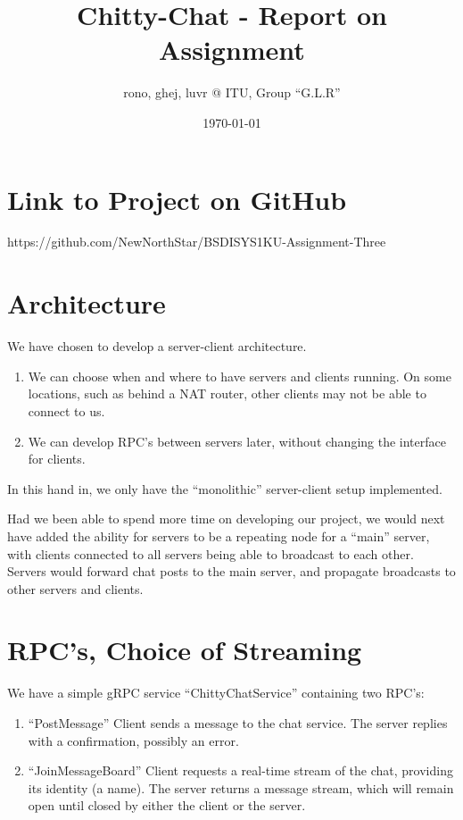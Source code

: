 \documentclass[a4paper,11pt]{article}
\title{Chitty-Chat - Report on Assignment}
\author{rono, ghej, luvr @ ITU, Group ``G.L.R''}
\date{\today}
\begin{document}
\maketitle

\tableofcontents

\pagebreak

\section{Link to Project on GitHub}
https://github.com/NewNorthStar/BSDISYS1KU-Assignment-Three

\section{Architecture}

We have chosen to develop a server-client architecture. 

\begin{enumerate}
    \item We can choose when and where to have servers and clients running. On some locations, such as behind a NAT router, other clients may not be able to connect to us. 
    \item We can develop RPC's between servers later, without changing the interface for clients. 
\end{enumerate}

In this hand in, we only have the ``monolithic'' server-client setup implemented. 

\bigbreak

Had we been able to spend more time on developing our project, we would next have added the ability for servers to be a repeating node for a ``main'' server, with clients connected to all servers being able to broadcast to each other. Servers would forward chat posts to the main server, and propagate broadcasts to other servers and clients. 

\section{RPC's, Choice of Streaming}
We have a simple gRPC service ``ChittyChatService'' containing two RPC's:

\begin{enumerate}
    \item ``PostMessage'' Client sends a message to the chat service. The server replies with a confirmation, possibly an error. 
    \item ``JoinMessageBoard'' Client requests a real-time stream of the chat, providing its identity (a name). The server returns a message stream, which will remain open until closed by either the client or the server. 
\end{enumerate}
\end{document}
